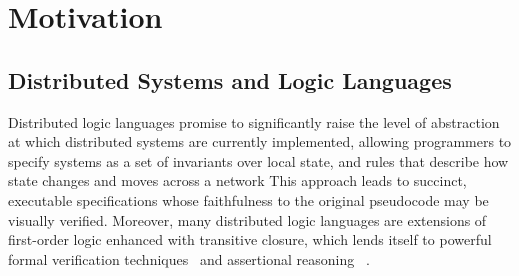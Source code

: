 \section{Motivation}

\subsection{Distributed Systems and Logic Languages}
\label{sec:dsll}


Distributed logic languages promise to significantly raise the level of
abstraction at which distributed systems are currently implemented, allowing
programmers to specify systems as a set of invariants over local state,
and rules that describe how state changes and moves across a network 
This approach leads to succinct, executable specifications whose faithfulness to the original pseudocode may be visually verified.
Moreover, many 
distributed logic languages are extensions of first-order logic enhanced with
transitive closure, which lends itself to powerful
formal verification techniques~\cite{wang, wang2} and assertional
reasoning~\cite{boom-techr} .

